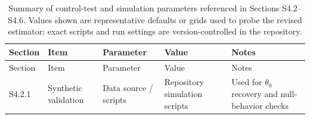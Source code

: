 \documentclass[
]{article}
\begin{document}
\begin{longtable}[]{@{}
  >{\raggedright\arraybackslash}p{}
  >{\raggedright\arraybackslash}p{}
  >{\raggedright\arraybackslash}p{}
  >{\raggedright\arraybackslash}p{}
  >{\raggedright\arraybackslash}p{}@{}}
\caption{Summary of control-test and simulation parameters referenced in Sections S4.2--S4.6. Values shown are representative defaults or grids used to probe the revised estimator; exact scripts and run settings are version-controlled in the repository.}\label{tbl:si_sim_params}\tabularnewline
\toprule\noalign{}
\begin{minipage}[b]{\linewidth}\raggedright
Section
\end{minipage} & \begin{minipage}[b]{\linewidth}\raggedright
Item
\end{minipage} & \begin{minipage}[b]{\linewidth}\raggedright
Parameter
\end{minipage} & \begin{minipage}[b]{\linewidth}\raggedright
Value
\end{minipage} & \begin{minipage}[b]{\linewidth}\raggedright
Notes
\end{minipage} \\
\midrule\noalign{}
\endfirsthead
\toprule\noalign{}
\begin{minipage}[b]{\linewidth}\raggedright
Section
\end{minipage} & \begin{minipage}[b]{\linewidth}\raggedright
Item
\end{minipage} & \begin{minipage}[b]{\linewidth}\raggedright
Parameter
\end{minipage} & \begin{minipage}[b]{\linewidth}\raggedright
Value
\end{minipage} & \begin{minipage}[b]{\linewidth}\raggedright
Notes
\end{minipage} \\
\midrule\noalign{}
\endhead
\bottomrule\noalign{}
\endlastfoot
S4.2.1 & Synthetic validation & Data source / scripts & Repository simulation scripts & Used for \(\theta_0\) recovery and null-behavior checks \\

\end{longtable}
\end{document}
